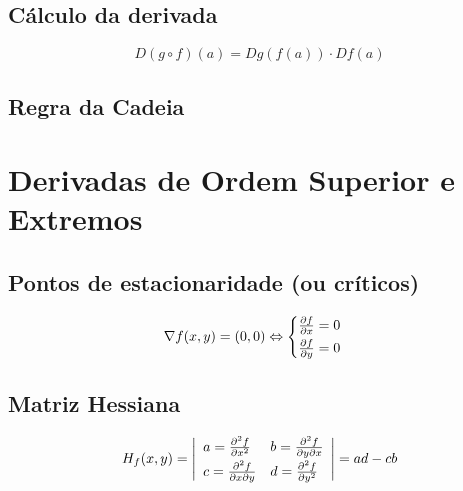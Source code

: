 \documentclass[11pt, a4paper]{article}
\begin{document}
\subsection{Cálculo da derivada}

\begin{equation*}
    D(g \circ f)(a) = Dg\left(f(a)\right) \cdot Df(a)
\end{equation*}

\subsection{Regra da Cadeia}



\section{Derivadas de Ordem Superior e Extremos}

\subsection{Pontos de estacionaridade (ou críticos)}

\begin{equation*}
    \nabla f(x, y) = (0, 0) \Leftrightarrow
    \begin{cases}
        \frac{\partial f}{\partial x} = 0 \vspace{2pt} \\
        \frac{\partial f}{\partial y} = 0
    \end{cases}
\end{equation*}

\subsection{Matriz Hessiana}

\begin{equation*}
    H_f(x, y) =
    \left\lvert
    \begin{array}{l l}
        a = \frac{\partial^2 f}{\partial x^2}          &
        b = \frac{\partial^2 f}{\partial y \partial x} \vspace{2pt} \\
        c = \frac{\partial^2 f}{\partial x \partial y} &
        d = \frac{\partial^2 f}{\partial y^2}
    \end{array}
    \right\rvert =
    ad - cb
\end{equation*}
\end{document}
